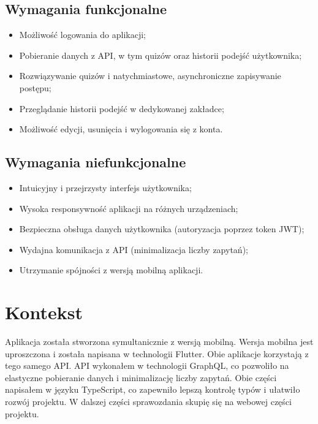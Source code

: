 \documentclass{article}
\begin{document}
    \subsection*{Wymagania funkcjonalne}
	\begin{itemize}
		\item Możliwość logowania do aplikacji;
		\item Pobieranie danych z API, w tym quizów oraz historii podejść użytkownika;
		\item Rozwiązywanie quizów i natychmiastowe, asynchroniczne zapisywanie postępu;
		\item Przeglądanie historii podejść w dedykowanej zakładce;
		\item Możliwość edycji, usunięcia i wylogowania się z konta.
	\end{itemize}
	
	\subsection*{Wymagania niefunkcjonalne}
	\begin{itemize}
		\item Intuicyjny i przejrzysty interfejs użytkownika;
		\item Wysoka responsywność aplikacji na różnych urządzeniach;
		\item Bezpieczna obsługa danych użytkownika (autoryzacja poprzez token JWT);
		\item Wydajna komunikacja z API (minimalizacja liczby zapytań);
		\item Utrzymanie spójności z wersją mobilną aplikacji.
	\end{itemize}

    \section{Kontekst}
        Aplikacja została stworzona symultanicznie z wersją mobilną. 
        Wersja mobilna jest uproszczona i została napisana w technologii Flutter.
        Obie aplikacje korzystają z tego samego API. 
        API wykonałem w technologii GraphQL, co pozwoliło na elastyczne pobieranie danych i minimalizację liczby zapytań.
        Obie części napisałem w języku TypeScript, co zapewniło lepszą kontrolę typów i ułatwiło rozwój projektu.
        W dalszej części sprawozdania skupię się na webowej części projektu.
\end{document}
